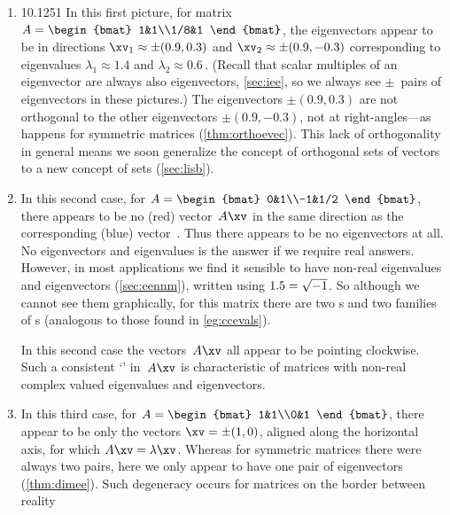 \begin{enumerate}
\item 
\begin{figbox}{1{0.125}{1}}%
In this first picture, for matrix
\( A=\begin{bmat} 1&1\\1/8&1 \end{bmat}\),
the eigenvectors appear to be in directions \(\xv_1\approx\pm(0.9,0.3)\) and \(\xv_2\approx\pm(0.9,-0.3)\) corresponding to eigenvalues \(\lambda_1\approx1.4\) and \(\lambda_2\approx 0.6\)\,.
(Recall that scalar multiples of an eigenvector are always also eigenvectors, \cref{sec:iee}, so we always see \(\pm\)~pairs of eigenvectors in these pictures.)
The eigenvectors \(\pm(0.9,0.3)\) are not orthogonal to the other 
eigenvectors \(\pm(0.9,-0.3)\), not at right-angles---as happens for symmetric matrices (\cref{thm:orthoevec}).
This lack of orthogonality in general means we soon generalize the concept of orthogonal sets of vectors to a new concept of  sets (\cref{sec:lisb}).
\end{figbox}

\item 
\begin{figbox}{}%
In this second case, for
\( A=\begin{bmat} 0&1\\-1&1/2 \end{bmat}\),
there appears to be no (red) vector~\(A\xv\) in the same direction as the corresponding (blue) vector~\xv.
Thus there appears to be no eigenvectors at all.
No eigenvectors and eigenvalues is the answer if we require real answers.
However, in most applications we find it sensible to have non-real  eigenvalues and eigenvectors (\cref{sec:eennm}), written using \(1.5=\sqrt{-1}\).
So although we cannot see them graphically, for this matrix there are two s and two families of s (analogous to those found in \cref{eg:ccevals}).%
\end{figbox}

In this second case the vectors~\(A\xv\) all appear to be pointing clockwise.  
Such a consistent `' in~\(A\xv\) is characteristic of matrices with non-real complex valued eigenvalues and eigenvectors.

\item 
\begin{figbox}{}%
In this third case, for
\( A=\begin{bmat} 1&1\\0&1 \end{bmat}\),
there appear to be only the vectors \(\xv=\pm(1,0)\), aligned along the horizontal axis, for which \(A\xv=\lambda\xv\).
Whereas for symmetric matrices there were always two pairs, here we only appear to have one pair of eigenvectors (\cref{thm:dimee}).
Such degeneracy occurs for matrices on the border between reality 
\vspace{1\baselineskip}
\end{figbox}


\end{enumerate}
